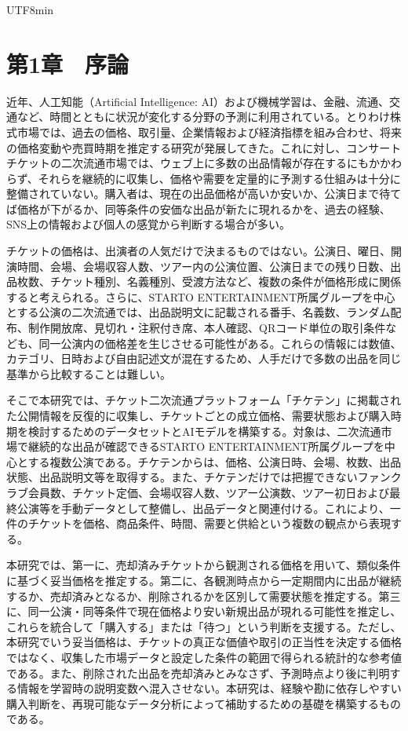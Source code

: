 \documentclass[a4paper,12pt]{report}
\begin{document}
\begin{CJK}{UTF8}{min}

\chapter*{第1章　序論}

近年、人工知能（Artificial Intelligence: AI）および機械学習は、金融、流通、交通など、時間とともに状況が変化する分野の予測に利用されている。とりわけ株式市場では、過去の価格、取引量、企業情報および経済指標を組み合わせ、将来の価格変動や売買時期を推定する研究が発展してきた。これに対し、コンサートチケットの二次流通市場では、ウェブ上に多数の出品情報が存在するにもかかわらず、それらを継続的に収集し、価格や需要を定量的に予測する仕組みは十分に整備されていない。購入者は、現在の出品価格が高いか安いか、公演日まで待てば価格が下がるか、同等条件の安価な出品が新たに現れるかを、過去の経験、SNS上の情報および個人の感覚から判断する場合が多い。

チケットの価格は、出演者の人気だけで決まるものではない。公演日、曜日、開演時間、会場、会場収容人数、ツアー内の公演位置、公演日までの残り日数、出品枚数、チケット種別、名義種別、受渡方法など、複数の条件が価格形成に関係すると考えられる。さらに、STARTO ENTERTAINMENT所属グループを中心とする公演の二次流通では、出品説明文に記載される番手、名義数、ランダム配布、制作開放席、見切れ・注釈付き席、本人確認、QRコード単位の取引条件なども、同一公演内の価格差を生じさせる可能性がある。これらの情報には数値、カテゴリ、日時および自由記述文が混在するため、人手だけで多数の出品を同じ基準から比較することは難しい。

そこで本研究では、チケット二次流通プラットフォーム「チケテン」に掲載された公開情報を反復的に収集し、チケットごとの成立価格、需要状態および購入時期を検討するためのデータセットとAIモデルを構築する。対象は、二次流通市場で継続的な出品が確認できるSTARTO ENTERTAINMENT所属グループを中心とする複数公演である。チケテンからは、価格、公演日時、会場、枚数、出品状態、出品説明文等を取得する。また、チケテンだけでは把握できないファンクラブ会員数、チケット定価、会場収容人数、ツアー公演数、ツアー初日および最終公演等を手動データとして整備し、出品データと関連付ける。これにより、一件のチケットを価格、商品条件、時間、需要と供給という複数の観点から表現する。

本研究では、第一に、売却済みチケットから観測される価格を用いて、類似条件に基づく妥当価格を推定する。第二に、各観測時点から一定期間内に出品が継続するか、売却済みとなるか、削除されるかを区別して需要状態を推定する。第三に、同一公演・同等条件で現在価格より安い新規出品が現れる可能性を推定し、これらを統合して「購入する」または「待つ」という判断を支援する。ただし、本研究でいう妥当価格は、チケットの真正な価値や取引の正当性を決定する価格ではなく、収集した市場データと設定した条件の範囲で得られる統計的な参考値である。また、削除された出品を売却済みとみなさず、予測時点より後に判明する情報を学習時の説明変数へ混入させない。本研究は、経験や勘に依存しやすい購入判断を、再現可能なデータ分析によって補助するための基礎を構築するものである。


\end{CJK}
\end{document}
